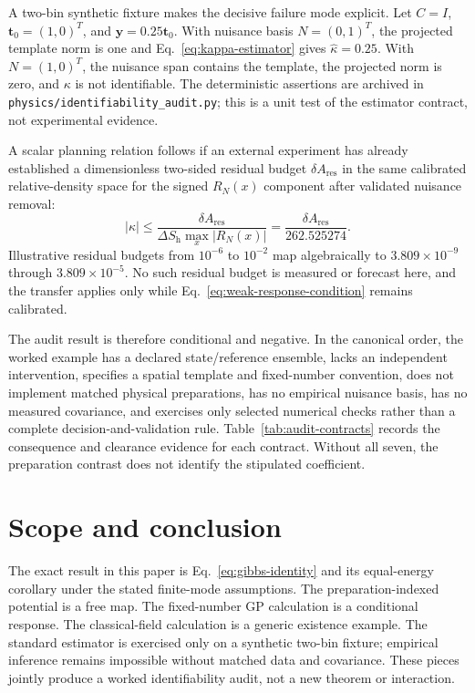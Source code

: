 \documentclass[aps,prd,twocolumn,superscriptaddress,nofootinbib,floatfix]{revtex4-2}
\begin{document}
A two-bin synthetic fixture makes the decisive failure mode explicit. Let $C=I$, $\bm t_0=(1,0)^T$, and $\bm y=0.25\bm t_0$. With nuisance basis $N=(0,1)^T$, the projected template norm is one and Eq.~\eqref{eq:kappa-estimator} gives $\widehat\kappa=0.25$. With $N=(1,0)^T$, the nuisance span contains the template, the projected norm is zero, and $\kappa$ is not identifiable. The deterministic assertions are archived in \texttt{physics/identifiability\_audit.py}; this is a unit test of the estimator contract, not experimental evidence.

A scalar planning relation follows if an external experiment has already established a dimensionless two-sided residual budget $\delta A_{\mathrm{res}}$ in the same calibrated relative-density space for the signed $R_N(x)$ component after validated nuisance removal:
\begin{equation}
 |\kappa|\leq
 \frac{\delta A_{\mathrm{res}}}
 {\Delta S_{\mathrm h}\max_x|R_N(x)|}
 =\frac{\delta A_{\mathrm{res}}}{262.525274}.
 \label{eq:prospective-bound}
\end{equation}
Illustrative residual budgets from $10^{-6}$ to $10^{-2}$ map algebraically to $3.809\times10^{-9}$ through $3.809\times10^{-5}$. No such residual budget is measured or forecast here, and the transfer applies only while Eq.~\eqref{eq:weak-response-condition} remains calibrated.

The audit result is therefore conditional and negative. In the canonical order, the worked example has a declared state/reference ensemble, lacks an independent intervention, specifies a spatial template and fixed-number convention, does not implement matched physical preparations, has no empirical nuisance basis, has no measured covariance, and exercises only selected numerical checks rather than a complete decision-and-validation rule. Table~\ref{tab:audit-contracts} records the consequence and clearance evidence for each contract. Without all seven, the preparation contrast does not identify the stipulated coefficient.

\section{Scope and conclusion}
\label{sec:nonclaims}

The exact result in this paper is Eq.~\eqref{eq:gibbs-identity} and its equal-energy corollary under the stated finite-mode assumptions. The preparation-indexed potential is a free map. The fixed-number GP calculation is a conditional response. The classical-field calculation is a generic existence example. The standard estimator is exercised only on a synthetic two-bin fixture; empirical inference remains impossible without matched data and covariance. These pieces jointly produce a worked identifiability audit, not a new theorem or interaction.
\end{document}
